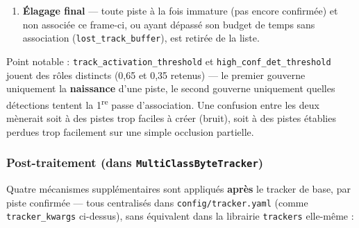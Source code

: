 \documentclass[11pt,a4paper]{article}
\let\Oldsubsubsection\subsubsection
\renewcommand{\subsubsection}{\FloatBarrier\Oldsubsubsection}
\begin{document}
\begin{enumerate}[leftmargin=1.7em]
        de confiance haute encore non associées après la 1\textsuperscript{re} passe
        \textbf{et} dont la confiance dépasse
        \texttt{track\_activation\_threshold} (plus strict que
        \texttt{high\_conf\_det\_threshold}) donnent naissance à une
        nouvelle piste. Les détections de confiance basse non associées ne
        créent jamais de piste.
      \item \textbf{Élagage final} --- toute piste à la fois immature (pas
        encore confirmée) et non associée ce frame-ci, ou ayant dépassé son
        budget de temps sans association (\texttt{lost\_track\_buffer}), est
        retirée de la liste.
    \end{enumerate}
    
    Point notable : \texttt{track\_activation\_threshold} et
    \texttt{high\_conf\_det\_threshold} jouent des rôles distincts
    (0,65 et 0,35 retenus) --- le premier gouverne
    uniquement la \textbf{naissance} d'une piste, le second gouverne
    uniquement quelles détections tentent la 1\textsuperscript{re} passe d'association.
    Une confusion entre les deux mènerait soit à des pistes trop faciles à
    créer (bruit), soit à des pistes établies perdues trop facilement sur
    une simple occlusion partielle.
    
    \subsubsection{Post-traitement (dans \texttt{MultiClassByteTracker})}
    
    Quatre mécanismes supplémentaires sont appliqués \textbf{après} le
    tracker de base, par piste confirmée --- tous centralisés dans
    \texttt{config/tracker.yaml} (comme \texttt{tracker\_kwargs} ci-dessus),
    sans équivalent dans la librairie \texttt{trackers} elle-même :
    
\end{document}
